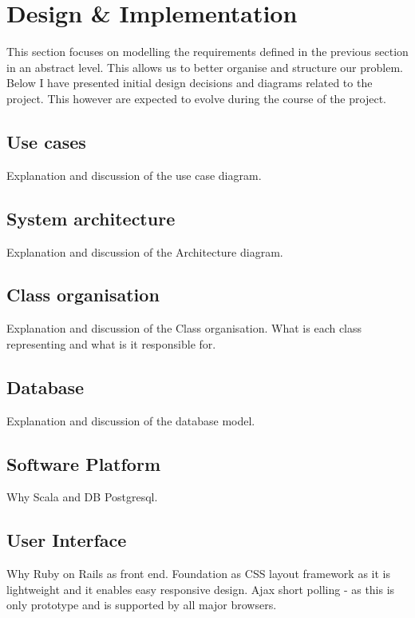 \chapter{Design \& Implementation}
This section focuses on modelling the requirements defined in the previous
section in an abstract level. This allows us to better organise and structure
our problem. Below I have presented initial design decisions and diagrams
related to the project. This however are expected to evolve during the course
of the project.
\section{Use cases}
Explanation and discussion of the use case diagram.

\section{System architecture}
Explanation and discussion of the Architecture diagram.

\section{Class organisation}
Explanation and discussion of the Class organisation. What is each class representing and what is it responsible for.

\section{Database}
Explanation and discussion of the database model.

\section{Software Platform}
Why Scala and DB Postgresql. 

\section{User Interface}
Why Ruby on Rails as front end. Foundation as CSS layout framework as it is lightweight and it enables easy responsive design.
Ajax short polling - as this is only prototype and is supported by all major browsers.